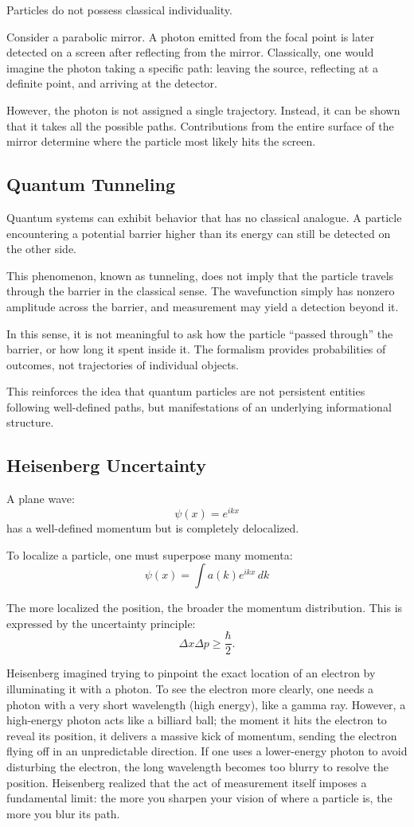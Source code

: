 Particles do not possess classical individuality. 

Consider a parabolic mirror. A photon emitted from the focal point is later detected on a screen after reflecting from the mirror. Classically, one would imagine the photon taking a specific path: leaving the source, reflecting at a definite point, and arriving at the detector.

However, the photon is not assigned a single trajectory. Instead, it can be shown that it takes all the possible paths. Contributions from the entire
surface of the mirror determine where the particle most likely hits the screen.


\subsection*{Quantum Tunneling}

Quantum systems can exhibit behavior that has no classical analogue. A particle encountering a potential barrier higher than its energy can still be detected on the other side.

This phenomenon, known as tunneling, does not imply that the particle travels through the barrier in the classical sense. The wavefunction simply has nonzero amplitude across the barrier, and measurement may yield a detection beyond it.

In this sense, it is not meaningful to ask how the particle “passed through” the barrier, or how long it spent inside it. The formalism provides probabilities of outcomes, not trajectories of individual objects.

This reinforces the idea that quantum particles are not persistent entities following well-defined paths, but manifestations of an underlying informational structure.


\subsection*{Heisenberg Uncertainty}

A plane wave:
\[
\psi(x) = e^{ikx}
\]
has a well-defined momentum but is completely delocalized.

To localize a particle, one must superpose many momenta:
\[
\psi(x) = \int a(k) e^{ikx} \, dk
\]

The more localized the position, the broader the momentum distribution. This is expressed by the uncertainty principle:
\[
\Delta x \Delta p \ge \frac{\hbar}{2}.
\]

Heisenberg imagined trying to pinpoint the exact location of an electron by illuminating it with a photon.
To see the electron more clearly, one needs a photon with a very short wavelength (high energy), like a gamma ray. However, a high-energy photon acts like a billiard ball; the moment it hits the electron to reveal its position, it delivers a massive kick of momentum, sending the electron flying off in an unpredictable direction. If one uses a lower-energy photon to avoid disturbing the electron, the long wavelength becomes too blurry to resolve the position. Heisenberg realized that the act of measurement itself imposes a fundamental limit: the more you sharpen your vision of where a particle is, the more you blur its path.

